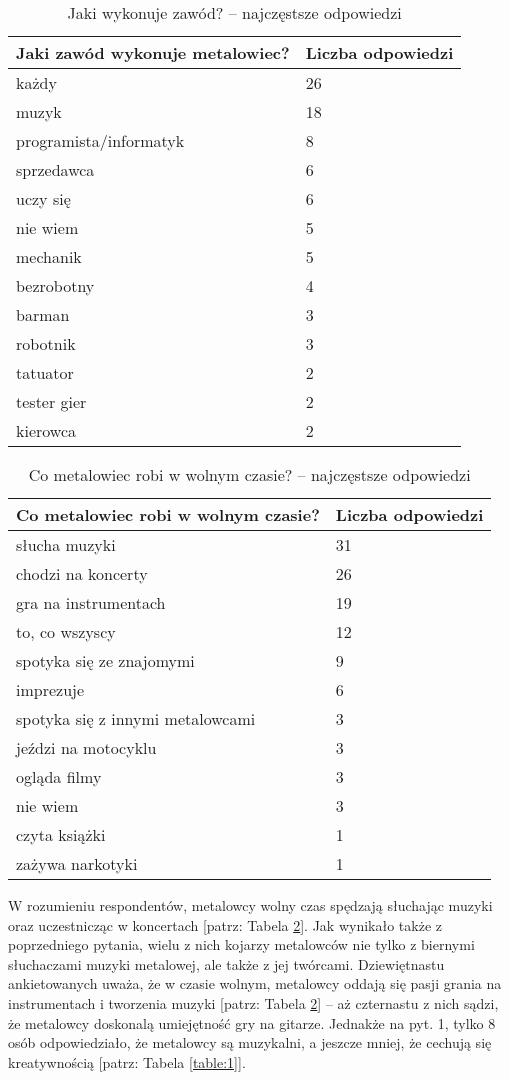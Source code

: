 \documentclass[12pt, a4paper, titlepage]{report}
\begin{document}
\begin{table}[!tp]
\begin{tabular}{ m{23em} | m{5em} } 
\textbf{Jaki zawód wykonuje metalowiec?} & Liczba odpowiedzi \\
\hline
każdy & 26 \\
muzyk & 18 \\
programista/informatyk & 8 \\
sprzedawca & 6 \\
uczy się & 6 \\
nie wiem & 5 \\
mechanik & 5 \\
bezrobotny & 4 \\
barman & 3 \\
robotnik & 3 \\
tatuator & 2 \\
tester gier & 2 \\
kierowca & 2 \\
\end{tabular} 
\caption{Jaki wykonuje zawód? -- najczęstsze odpowiedzi}
\label{table:3}
\end{table}
\newpage
\begin{table}[!htb]
\begin{tabular}{ m{23em} | m{5em} } 
\textbf{Co metalowiec robi w wolnym czasie?
} & Liczba odpowiedzi \\
\hline
słucha muzyki & 31 \\
chodzi na koncerty & 26 \\
gra na instrumentach & 19 \\
to, co wszyscy & 12 \\
spotyka się ze znajomymi & 9 \\
imprezuje & 6 \\
spotyka się z innymi metalowcami & 3 \\
jeździ na motocyklu & 3 \\
ogląda filmy & 3 \\
nie wiem & 3 \\
czyta książki & 1 \\
zażywa narkotyki & 1 \\
\end{tabular} 
\caption{Co metalowiec robi w wolnym czasie? -- najczęstsze odpowiedzi}
\label{table:4}
\end{table}

W rozumieniu respondentów, metalowcy wolny czas spędzają słuchając muzyki oraz uczestnicząc w koncertach [patrz: Tabela \ref{table:4}]. Jak wynikało także z poprzedniego pytania, wielu z nich kojarzy metalowców nie tylko z biernymi słuchaczami muzyki metalowej, ale także z jej twórcami. Dziewiętnastu ankietowanych uważa, że w czasie wolnym, metalowcy oddają się pasji grania na instrumentach i tworzenia muzyki [patrz: Tabela \ref{table:4}] -- aż czternastu z nich sądzi, że metalowcy doskonalą umiejętność gry na gitarze. Jednakże na pyt. 1, tylko 8 osób odpowiedziało, że metalowcy są muzykalni, a jeszcze mniej, że cechują się kreatywnością [patrz: Tabela \ref{table:1}].
\end{document}
